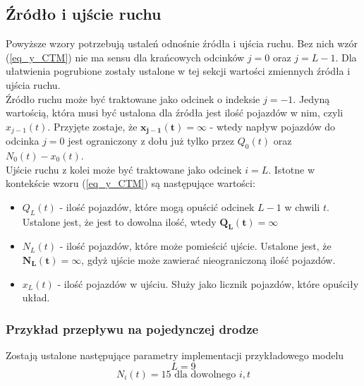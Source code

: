 \documentclass[12pt]{book}
\theoremstyle{plain}
\newcommand{\myref}[1]{(\ref{#1})}
\begin{document}
\subsection*{Źródło i ujście ruchu}
Powyższe wzory potrzebują ustaleń odnośnie źródła i ujścia ruchu. Bez nich wzór \myref{eq_y_CTM} nie ma sensu dla krańcowych odcinków $j=0$ oraz $j=L-1$. Dla ułatwienia pogrubione zostały ustalone w tej sekcji wartości zmiennych źródła i ujścia ruchu. \\ Źródło ruchu może być traktowane jako odcinek o indeksie $j=-1$. Jedyną wartością, która musi być ustalona dla źródła jest ilość pojazdów w nim, czyli $x_{j-1}(t)$. Przyjęte zostaje, że $\mathbf{x_{j-1}(t)=\infty}$ - wtedy napływ pojazdów do odcinka $j=0$ jest ograniczony z dołu już tylko przez $Q_0(t)$ oraz $N_0(t)-x_0(t)$.
\\
Ujście ruchu z kolei może być traktowane jako odcinek $i=L$. Istotne w kontekście wzoru \myref{eq_y_CTM} są następujące wartości:
\begin{itemize}
	\item $Q_{L}(t)$ - ilość pojazdów, które mogą opuścić odcinek $L-1$ w chwili $t$. Ustalone jest, że jest to dowolna ilość, wtedy $\mathbf{Q_{L}(t)=\infty}$
	\item $N_{L}(t)$ - ilość pojazdów, które może pomieścić ujście. Ustalone jest, że $\mathbf{N_{L}(t)=\infty}$, gdyż ujście może zawierać nieograniczoną ilość pojazdów.
	\item $x_{L}(t)$ - ilość pojazdów w ujściu. Służy jako licznik pojazdów, które opuściły układ.
\end{itemize}
\subsubsection*{Przykład przepływu na pojedynczej drodze}
Zostają ustalone następujące parametry implementacji przykładowego modelu
	 \[L=9\]
	 \[N_i(t)=15 \text{ dla dowolnego $i,t$} \]
	 
\end{document}
